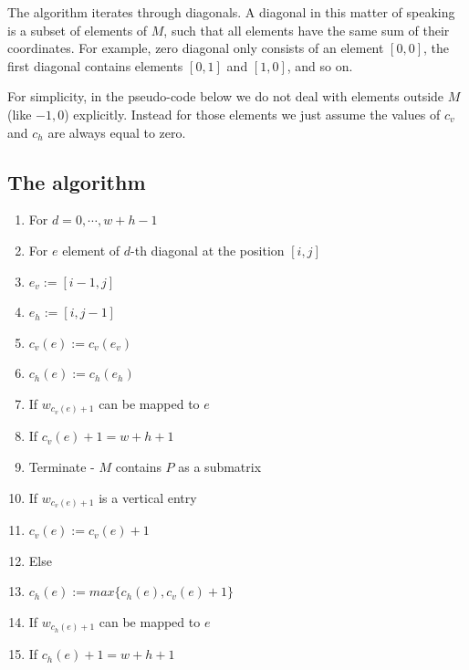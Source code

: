 The algorithm iterates through diagonals. A diagonal in this matter of speaking is a subset of elements of $M$, such that all elements have the same sum of their coordinates. For example, zero diagonal only consists of an element $[0,0]$, the first diagonal contains elements $[0,1]$ and $[1,0]$, and so on.

For simplicity, in the pseudo-code below we do not deal with elements outside $M$ (like $-1,0$) explicitly. Instead for those elements we just assume the values of $c_v$ and $c_h$ are always equal to zero.

\subsection{The algorithm}
\begin{enumerate}
\item For $d=0,\cdots,w+h-1$
\item \hspace{5mm} For $e$ element of $d$-th diagonal at the position $[i,j]$
\item \hspace{1cm} $e_v:=[i-1,j]$
\item \hspace{1cm} $e_h:=[i,j-1]$
\item \hspace{1cm} $c_v(e):=c_v(e_v)$
\item \hspace{1cm} $c_h(e):=c_h(e_h)$
\item \hspace{1cm} If $w_{c_v(e)+1}$ can be mapped to $e$
\item \hspace{15mm} If $c_v(e)+1=w+h+1$
\item \hspace{2cm} Terminate - $M$ contains $P$ as a submatrix
\item \hspace{15mm} If $w_{c_v(e)+1}$ is a vertical entry
\item \hspace{2cm} $c_v(e):=c_v(e)+1$
\item \hspace{15mm} Else
\item \hspace{2cm} $c_h(e):=max\{c_h(e),c_v(e)+1\}$
\item \hspace{1cm} If $w_{c_h(e)+1}$ can be mapped to $e$
\item \hspace{15mm} If $c_h(e)+1=w+h+1$

\end{enumerate}
